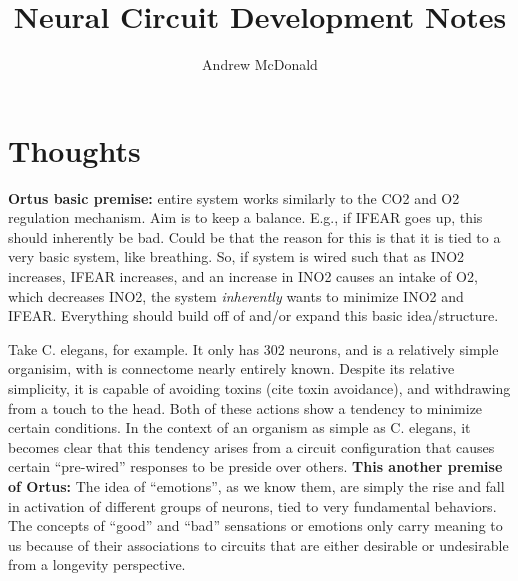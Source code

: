 \documentclass[11pt, a4paper, oneside]{article}   	%
\title{Neural Circuit Development Notes}
\author{Andrew McDonald}
\begin{document}
\maketitle
\hypersetup{linkcolor=blue}
\tableofcontents
\hypersetup{linkcolor=blue}
\listoffigures
\hypersetup{linkcolor=blue} %


\section{Thoughts}



\textbf{Ortus basic premise:} entire system works similarly to the CO2 and O2 regulation mechanism. Aim is to keep a balance. E.g., if IFEAR goes up, this should inherently be bad. Could be that the reason for this is that it is tied to a very basic system, like breathing. So, if system is wired such that as INO2 increases, IFEAR increases, and an increase in INO2 causes an intake of O2, which decreases INO2, the system \textit{inherently} wants to minimize INO2 and IFEAR. Everything should build off of and/or expand this basic idea/structure.

Take C. elegans, for example. It only has 302 neurons, and is a relatively simple organisim, with is connectome nearly entirely known. Despite its relative simplicity, it is capable of avoiding toxins (cite toxin avoidance), and withdrawing from a touch to the head. Both of these actions show a tendency to minimize certain conditions. In the context of an organism as simple as C. elegans, it becomes clear that this tendency arises from a circuit configuration that causes certain ``pre-wired'' responses to be preside over others. \textbf{This another premise of Ortus:} The idea of ``emotions'', as we know them, are simply the rise and fall in activation of different groups of neurons, tied to very fundamental behaviors. The concepts of ``good'' and ``bad'' sensations or emotions only carry meaning to us because of their associations to circuits that are either desirable or undesirable from a longevity perspective.
\end{document}
